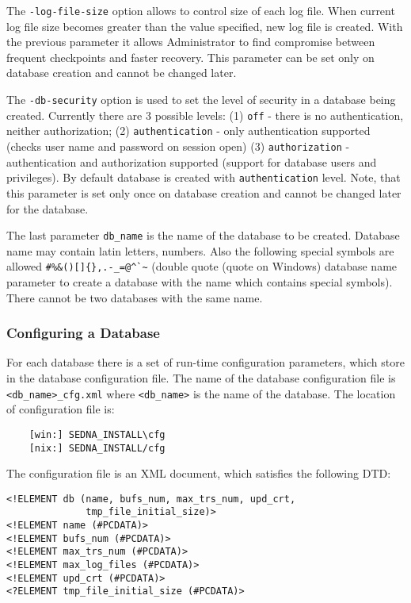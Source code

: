 \documentclass[a4paper,12pt]{article}
\begin{document}
The \verb!-log-file-size! option allows to control size of each log file. When current log file size becomes greater than the value specified, new log file is created. With the previous parameter it allows Administrator to find compromise between frequent checkpoints and faster recovery. This parameter can be set only on database creation and cannot be changed later.

The \verb!-db-security! option is used to set the level of security in a database being created. Currently there are 3 possible levels: (1) \verb!off! - there is no authentication, neither authorization; (2) \verb!authentication! - only authentication supported (checks user name and password on session open) (3) \verb!authorization! - authentication and authorization supported (support for database users and privileges). By default database is created with \verb!authentication! level. Note, that this parameter is set only once on database creation and cannot be changed later for the database.

The last parameter \verb!db_name! is the name of the database to be created.
Database name may contain latin letters, numbers. Also the following special
symbols are allowed \verb!#%&()[]{},.-_=@^`~! (double quote (quote on Windows) 
database name parameter to create a database with the name which contains 
special symbols). There cannot be two databases with the same name.

\subsubsection{Configuring a Database}
\label{ConfigDB}
For each database there is a set of run-time configuration parameters, which store in the database configuration file. The name of the database configuration file is \verb!<db_name>_cfg.xml! where \verb!<db_name>! is the name of the database. The location of configuration file is:
\begin{verbatim}
	[win:] SEDNA_INSTALL\cfg
	[nix:] SEDNA_INSTALL/cfg
\end{verbatim}

The configuration file is an XML document, which satisfies the following DTD:

\begin{verbatim}
<!ELEMENT db (name, bufs_num, max_trs_num, upd_crt, 
              tmp_file_initial_size)>
<!ELEMENT name (#PCDATA)>
<!ELEMENT bufs_num (#PCDATA)>
<!ELEMENT max_trs_num (#PCDATA)>
<!ELEMENT max_log_files (#PCDATA)>
<!ELEMENT upd_crt (#PCDATA)>
<?ELEMENT tmp_file_initial_size (#PCDATA)>
\end{verbatim}
\end{document}
